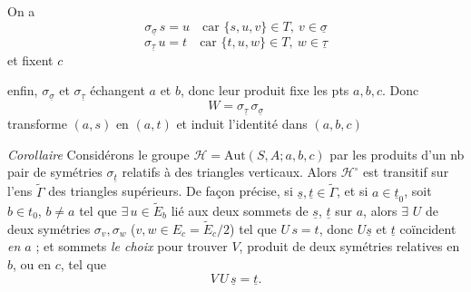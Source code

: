 \documentclass[11pt,a4paper]{article}
\begin{document}
On a
\[
  \sigma_{\underline{\sigma}}\,s=u \quad\text{car } \{s,u,v\}\in T,\ v\in\underline{\sigma}
\]
\[
  \sigma_{\underline{\tau}}\,u=t \quad\text{car } \{t,u,w\}\in T,\ w\in\underline{\tau}
\]
et fixent $c$ 

enfin, $\sigma_{\underline{\sigma}}$ et $\sigma_{\underline{\tau}}$ échangent $a$
et $b$, donc leur produit fixe les pts $a,b,c$. Donc
\[
  W=\sigma_{\underline{\tau}}\,\sigma_{\underline{\sigma}}
\]
transforme $(a,s)$ en $(a,t)$ et induit l'identité dans $(a,b,c)$




\emph{Corollaire} Considérons  le groupe  \struck{\ill{}}
$\mathcal{H}=\mathrm{Aut}(S,A;a,b,c)$   par les
produits d'un nb pair de symétries $\sigma_{\underline{t}}$ relatifs à des
triangles verticaux. Alors $\mathcal{H}^{\circ}$ est transitif sur l'ens
$\widetilde{\Gamma}$ des triangles supérieurs. De façon précise, si
\struck{\ill{}} $\underline{s},\underline{t}\in\widetilde{\Gamma}$, et si
$a\in\underline{t}_0$, soit \struck{\ill{}} $b\in t_0$, $b\neq a$ tel que
$\exists\,u\in\widetilde{E}_b$ lié aux deux sommets  de
$\underline{s}$, $\underline{t}$ sur $a$, alors $\exists$  $U$ de
deux symétries  $\sigma_v,\sigma_w$
($v,w\in E_c=\widetilde{E}_c/2$) tel que $U\,s=t$, donc
$U\underline{s}$ et $\underline{t}$ coïncident \emph{en $a$} ; et \ill{} \ill{}
sommets \emph{le choix} pour trouver $V$, produit de deux
symétries relatives en $b$, ou en $c$, tel que
\[
  V\,U\,\underline{s}=\underline{t}.
\]
\end{document}
